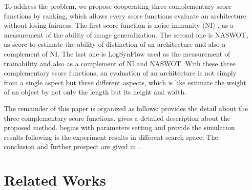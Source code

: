 \documentclass[sigconf]{acmart}
\begin{document}
    To address the problem, we propose cooperating three complementary 
    score functions by ranking, which allows every score functions 
    evaluate an architecture without losing fairness. 
    The first score function is noise immunity (NI) \cite{10092788}, as 
    a measurement of the ability of image generalization. 
    The second one is NASWOT, as score to estimate the ability of distinction 
    of an architecture and also a complement of NI. 
    The last one is LogSynFlow used as the measurement of trainability 
    and also as a complement of NI and NASWOT. 
    With these three complementary score functions, an evaluation of an 
    architecture is not simply from a single aspect but three different 
    aspects, which is like estimate the weight of an object by not only 
    the length but its height and width. 


    The remainder of this paper is organized as follows: 
     provides the detail about the three 
    complementary score functions.  gives a detailed 
    description about the proposed method.  begins 
    with parameters setting and provide the simulation results following 
    is the experiment results in different search space. The conclusion 
    and further prospect are gived in .

    \section{Related Works}
    \label{sec:related_work}
\end{document}
